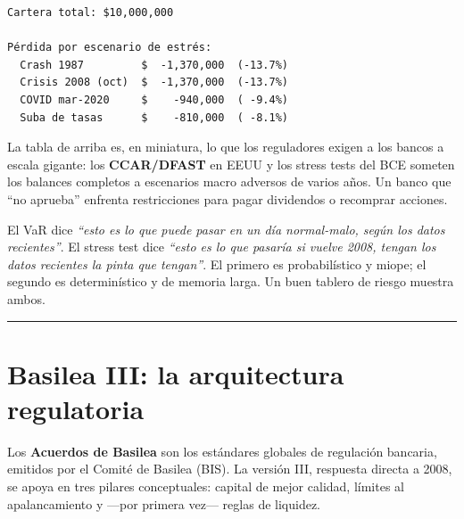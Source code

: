\documentclass[
  spanish,
  letterpaper,
  DIV=11,
  numbers=noendperiod]{scrreprt}
\begin{document}
\begin{verbatim}
Cartera total: $10,000,000

Pérdida por escenario de estrés:
  Crash 1987         $  -1,370,000  (-13.7%)
  Crisis 2008 (oct)  $  -1,370,000  (-13.7%)
  COVID mar-2020     $    -940,000  ( -9.4%)
  Suba de tasas      $    -810,000  ( -8.1%)
\end{verbatim}

La tabla de arriba es, en miniatura, lo que los reguladores exigen a los
bancos a escala gigante: los \textbf{CCAR/DFAST} en EEUU y los stress
tests del BCE someten los balances completos a escenarios macro adversos
de varios años. Un banco que ``no aprueba'' enfrenta restricciones para
pagar dividendos o recomprar acciones.

\begin{tcolorbox}[enhanced jigsaw, bottomrule=.15mm, colback=white, opacitybacktitle=0.6, arc=.35mm, toprule=.15mm, opacityback=0, breakable, titlerule=0mm, left=2mm, coltitle=black, colbacktitle=quarto-callout-tip-color!10!white, colframe=quarto-callout-tip-color-frame, leftrule=.75mm, toptitle=1mm, bottomtitle=1mm, title=\textcolor{quarto-callout-tip-color}{\faLightbulb}\hspace{0.5em}{VaR y stress testing se complementan}, rightrule=.15mm]

El VaR dice \emph{``esto es lo que puede pasar en un día normal-malo,
según los datos recientes''}. El stress test dice \emph{``esto es lo que
pasaría si vuelve 2008, tengan los datos recientes la pinta que
tengan''}. El primero es probabilístico y miope; el segundo es
determinístico y de memoria larga. Un buen tablero de riesgo muestra
ambos.

\end{tcolorbox}

\begin{center}\rule{0.5\linewidth}{0.5pt}\end{center}

\chapter{Basilea III: la arquitectura
regulatoria}\label{basilea-iii-la-arquitectura-regulatoria}

Los \textbf{Acuerdos de Basilea} son los estándares globales de
regulación bancaria, emitidos por el Comité de Basilea (BIS). La versión
III, respuesta directa a 2008, se apoya en tres pilares conceptuales:
capital de mejor calidad, límites al apalancamiento y ---por primera
vez--- reglas de liquidez.
\end{document}
